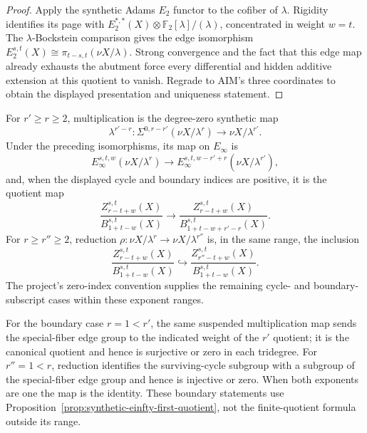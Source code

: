 \begin{proof}
  Apply the synthetic Adams $E_2$ functor to the cofiber of $\lambda$.
  Rigidity identifies its page with
  $E_2^{*,*}(X)\otimes\mathbb F_2[\lambda]/(\lambda)$, concentrated in weight
  $w=t$.  The $\lambda$-Bockstein comparison gives the edge isomorphism
  $E_2^{s,t}(X)\cong\pi_{t-s,t}(\nu X/\lambda)$.  Strong convergence and the
  fact that this edge map already exhausts the abutment force every
  differential and hidden additive extension at this quotient to vanish.
  Regrade to AIM's three coordinates to obtain the displayed presentation and
  uniqueness statement.
\end{proof}

\begin{proposition}
  \label{prop:synthetic-einfty-map-compatibility}
  \notready
  For $r'\ge r\ge2$, multiplication is the degree-zero synthetic map
  \[
    \lambda^{r'-r}:
    \Sigma^{0,r-r'}(\nu X/\lambda^r)\longrightarrow\nu X/\lambda^{r'}.
  \]
  Under the preceding isomorphisms, its map on $E_\infty$ is
  \[
    E_\infty^{s,t,w}(\nu X/\lambda^r)
      \longrightarrow
    E_\infty^{s,t,w-r'+r}(\nu X/\lambda^{r'}),
  \]
  and, when the displayed cycle and boundary indices are positive, it is the
  quotient map
  \[
    \frac{Z_{r-t+w}^{s,t}(X)}{B_{1+t-w}^{s,t}(X)}
      \longrightarrow
    \frac{Z_{r-t+w}^{s,t}(X)}{B_{1+t-w+r'-r}^{s,t}(X)}.
  \]
  For $r\ge r''\ge2$, reduction
  $\rho:\nu X/\lambda^r\to\nu X/\lambda^{r''}$
  is, in the same range, the inclusion
  \[
    \frac{Z_{r-t+w}^{s,t}(X)}{B_{1+t-w}^{s,t}(X)}
      \hookrightarrow
    \frac{Z_{r''-t+w}^{s,t}(X)}{B_{1+t-w}^{s,t}(X)}.
  \]
  The project's zero-index convention supplies the remaining cycle- and
  boundary-subscript cases within these exponent ranges.

  For the boundary case $r=1<r'$, the same suspended multiplication map sends
  the special-fiber edge group to the indicated weight of the $r'$ quotient;
  it is the canonical quotient and hence is surjective or zero in each
  tridegree.  For $r''=1<r$, reduction identifies the surviving-cycle subgroup
  with a subgroup of the special-fiber edge group and hence is injective or
  zero.  When both exponents are one the map is the identity.  These boundary
  statements use Proposition~\ref{prop:synthetic-einfty-first-quotient}, not
  the finite-quotient formula outside its range.


\end{proposition}
